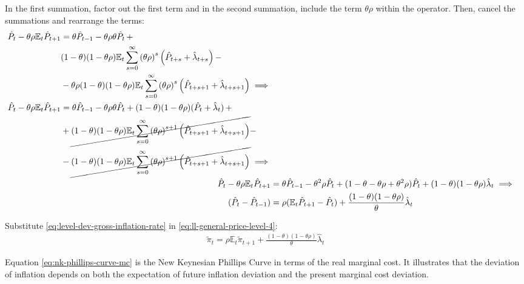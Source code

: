 \documentclass[
	12pt,
	]{article}
\numberwithin{equation}{section}
\newcommand{\E}[1][t]{{\mathbb{E}_{#1}}}
\theoremstyle{definition}
\theoremstyle{plain}
\theoremstyle{plain}
\theoremstyle{plain}
\begin{document}
In the first summation, factor out the first term and in the second summation, include the term $\theta \rho$ within the operator. Then, cancel the summations and rearrange the terms:
\begin{align}
	\begin{split}
		\hat{P}_t - \theta \rho \E \hat{P}_{t+1} &= \theta \hat{P}_{t-1} - \theta \rho \theta \hat{P}_t \, + \\
		& (1-\theta) (1- \theta \rho) \E \sum_{s=0}^{\infty} \left( \theta \rho \right)^s \left( \hat{P}_{t+s} + \hat{\lambda}_{t+s} \right) -
	\\
		& - \theta \rho (1-\theta) (1- \theta \rho) \E \sum_{s=0}^{\infty} \left( \theta \rho \right)^s \left( \hat{P}_{t+s+1} + \hat{\lambda}_{t+s+1} \right) \implies \nonumber 
	\end{split} \\
	\begin{split}
		\hat{P}_t - \theta \rho \E \hat{P}_{t+1} &= \theta \hat{P}_{t-1} - \theta \rho \theta \hat{P}_t + (1-\theta) (1- \theta \rho) (\hat{P}_t + \hat{\lambda}_t) \, + 
	\\
		& + \cancel{(1-\theta) (1- \theta \rho) \E \sum_{s=0}^{\infty} \left( \theta \rho \right)^{s+1} \left( \hat{P}_{t+s+1} + \hat{\lambda}_{t+s+1} \right)} -
	\\
		& - \cancel{(1-\theta) (1- \theta \rho) \E \sum_{s=0}^{\infty} \left( \theta \rho \right)^{s+1} \left( \hat{P}_{t+s+1} + \hat{\lambda}_{t+s+1} \right)} \implies \nonumber 
	\end{split} \\
		\hat{P}_t - \theta \rho \E \hat{P}_{t+1} &= \theta \hat{P}_{t-1} - \theta^2 \rho \hat{P}_t + (1- \theta -\theta \rho + \theta^2 \rho) \hat{P}_t + (1-\theta) (1- \theta \rho) \hat{\lambda}_t \implies \nonumber \\
		(\hat{P}_t - \hat{P}_{t-1}) &= \rho (\E \hat{P}_{t+1} - \hat{P}_t) + \frac{(1-\theta) (1- \theta \rho)}{\theta} \hat{\lambda}_t
	\label{eq:ll-general-price-level-4}
\end{align}

Substitute \ref{eq:level-dev-gross-inflation-rate} in \ref{eq:ll-general-price-level-4}:
\begin{align}
	\widetilde{\pi}_t = \rho \E \widetilde{\pi}_{t+1} + \frac{(1-\theta) (1- \theta \rho)}{\theta} \hat{\lambda}_t \label{eq:nk-phillips-curve-mc}
\end{align}

Equation \ref{eq:nk-phillips-curve-mc} is the New Keynesian Phillips Curve in terms of the real marginal cost. It illustrates that the deviation of inflation depends on both the expectation of future inflation deviation and the present marginal cost deviation.
\end{document}
